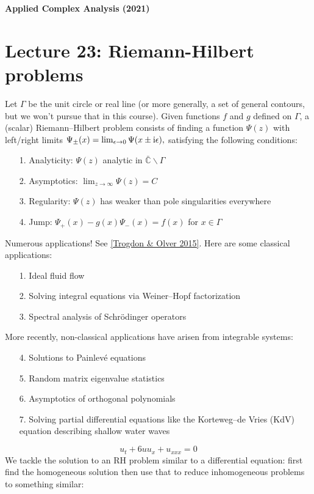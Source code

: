 \documentclass[12pt,a4paper]{article}
\def\I{ {\rm i} }
\def\C{ {\mathbb C} }
\def\endash{–}
\begin{document}
\textbf{Applied Complex Analysis (2021)}

\section{Lecture 23: Riemann-Hilbert problems}
Let $\Gamma$ be the unit circle or real line (or more generally, a set of general contours, but we won't pursue that in this course). Given functions $f$ and $g$ defined on $\Gamma$, a (scalar) Riemann\ensuremath{\endash}Hilbert problem consists of finding a function $\Psi(z)$ with left/right limits $\Psi_\pm(x) = \lim_{\epsilon \rightarrow 0} \Psi(x \pm \I \epsilon),$ satisfying the following conditions:

\begin{itemize}
\item[1. ] Analyticity: $\Psi(z)$ analytic in $\bar\C \backslash \Gamma$


\item[2. ] Asymptotics: $\lim_{z \rightarrow \infty} \Psi(z) = C$


\item[3. ] Regularity: $\Psi(z)$ has weaker than pole singularities everywhere


\item[4. ] Jump: $\Psi_+(x) - g(x) \Psi_-(x) = f(x)$ for $x \in \Gamma$

\end{itemize}
Numerous applications! See \href{http://bookstore.siam.org/ot146/}{[Trogdon \& Olver 2015]}. Here are some classical applications:

\begin{itemize}
\item[1. ] Ideal fluid flow


\item[2. ] Solving integral equations via Weiner\ensuremath{\endash}Hopf factorization


\item[3. ] Spectral analysis of Schrödinger operators

\end{itemize}
More recently, non-classical applications have arisen from integrable systems:

\begin{itemize}
\item[4. ] Solutions to Painlevé equations


\item[5. ] Random matrix eigenvalue statistics


\item[6. ] Asymptotics of orthogonal polynomials


\item[7. ] Solving partial differential equations like the Korteweg\ensuremath{\endash}de Vries (KdV) equation describing shallow water waves

\end{itemize}
\[
u_t + 6u u_x + u_{xxx} = 0
\]
We tackle the solution to an RH problem similar to a differential equation: first find the homogeneous solution then use that to reduce inhomogeneous problems to something similar:
\end{document}

